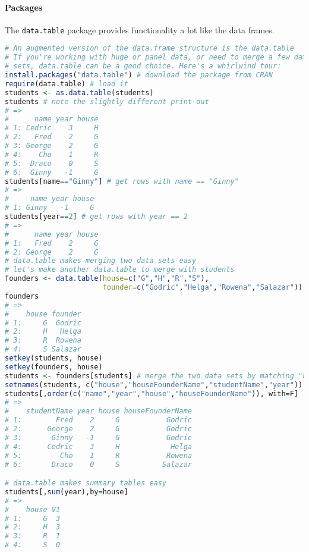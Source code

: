 \paragraph{Packages}
The \texttt{data.table} package provides functionality a lot like the data frames.
\begin{lstlisting}[language={r}, style=snippet]
# An augmented version of the data.frame structure is the data.table
# If you're working with huge or panel data, or need to merge a few data
# sets, data.table can be a good choice. Here's a whirlwind tour:
install.packages("data.table") # download the package from CRAN
require(data.table) # load it
students <- as.data.table(students)
students # note the slightly different print-out
# =>
#      name year house
# 1: Cedric    3     H
# 2:   Fred    2     G
# 3: George    2     G
# 4:    Cho    1     R
# 5:  Draco    0     S
# 6:  Ginny   -1     G
students[name=="Ginny"] # get rows with name == "Ginny"
# =>
#     name year house
# 1: Ginny   -1     G
students[year==2] # get rows with year == 2
# =>
#      name year house
# 1:   Fred    2     G
# 2: George    2     G
# data.table makes merging two data sets easy
# let's make another data.table to merge with students
founders <- data.table(house=c("G","H","R","S"),
                       founder=c("Godric","Helga","Rowena","Salazar"))
founders
# =>
#    house founder
# 1:     G  Godric
# 2:     H   Helga
# 3:     R  Rowena
# 4:     S Salazar
setkey(students, house)
setkey(founders, house)
students <- founders[students] # merge the two data sets by matching "house"
setnames(students, c("house","houseFounderName","studentName","year"))
students[,order(c("name","year","house","houseFounderName")), with=F]
# =>
#    studentName year house houseFounderName
# 1:        Fred    2     G           Godric
# 2:      George    2     G           Godric
# 3:       Ginny   -1     G           Godric
# 4:      Cedric    3     H            Helga
# 5:         Cho    1     R           Rowena
# 6:       Draco    0     S          Salazar

# data.table makes summary tables easy
students[,sum(year),by=house]
# =>
#    house V1
# 1:     G  3
# 2:     H  3
# 3:     R  1
# 4:     S  0
\end{lstlisting}